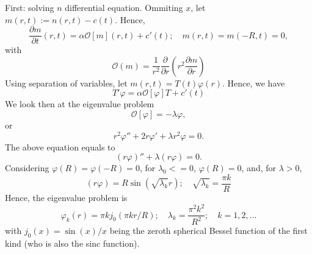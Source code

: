 \documentclass[]{article}
\newcommand{\pderiv}[2]{\frac{\partial #1}{\partial #2}}
\begin{document}
First: solving $n$ differential equation. Ommiting $x$, let $m(r,t) := n(r,t) - c(t)$. Hence,
\begin{equation}\label{precipitatemproblem}
	\pderiv{m}{t}(r,t) = \alpha \mathcal{O}[m](r,t) + c'(t); \quad m(r,t) = m(-R,t) = 0,
\end{equation}
with
\begin{equation}
	\mathcal{O}(m) = \frac{1}{r^2} \pderiv{}{r} \left( r^2 \pderiv{m}{r} \right)
\end{equation}
Using separation of variables, let $m(r,t) = T(t) \varphi(r)$. Hence, we have
\begin{equation}
 T' \varphi = \alpha \mathcal{O}[\varphi] T + c'(t)
\end{equation}
We look then at the eigenvalue problem
\begin{equation}
\mathcal{O}[\varphi] = -\lambda \varphi,
\end{equation}
or
\begin{equation}
r^2 \varphi'' + 2 r \varphi' + \lambda r^2 \varphi = 0.
\end{equation}
The above equation equals to
\begin{equation}
(r \varphi)'' + \lambda (r \varphi) = 0.
\end{equation}
Considering $\varphi(R) = \varphi(-R) = 0$, for $\lambda_0 <= 0$, $\varphi(R) = 0$, and, for $\lambda > 0$,
\begin{equation}
(r \varphi) = R \sin (\sqrt{\lambda_k} r); \quad \sqrt{\lambda_k} = \frac{\pi k}{R}
\end{equation}
Hence, the eigenvalue problem is 
\begin{equation}\label{eigenvaluemproblem}
\varphi_k(r) = \pi k j_0(\pi k r/R); \quad \lambda_k = \frac{\pi^2 k^2}{R^2}; \quad k = 1, 2, ...
\end{equation}
with $j_0(x) = \sin(x)/x$ being the zeroth spherical Bessel function of the first kind (who is also the sinc function).
\end{document}
